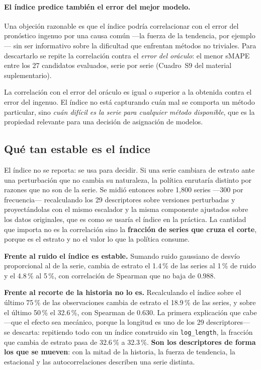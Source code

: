 \paragraph{El índice predice también el error del mejor modelo.} Una objeción
razonable es que el índice podría correlacionar con el error del pronóstico ingenuo
por una causa común ---la fuerza de la tendencia, por ejemplo--- sin ser informativo
sobre la dificultad que enfrentan métodos no triviales. Para descartarlo se repite la
correlación contra el \emph{error del oráculo}: el menor sMAPE entre los 27 candidatos
evaluados, serie por serie (Cuadro~S9 del material suplementario).



La correlación con el error del oráculo es igual o superior a la obtenida contra el
error del ingenuo. El índice no está capturando cuán mal se comporta un método
particular, sino \emph{cuán difícil es la serie para cualquier método disponible},
que es la propiedad relevante para una decisión de asignación de modelos.

\subsection{Qué tan estable es el índice}\label{sec:estabilidad}

El índice no se reporta: se usa para decidir. Si una serie cambiara de estrato ante una
perturbación que no cambia su naturaleza, la política enrutaría distinto por razones que
no son de la serie. Se midió entonces sobre 1{,}800 series ---300 por frecuencia---
recalculando los 29 descriptores sobre versiones perturbadas y proyectándolas con el
mismo escalador y la misma componente ajustados sobre los datos originales, que es como
se usaría el índice en la práctica. La cantidad que importa no es la correlación sino la
\textbf{fracción de series que cruza el corte}, porque es el estrato y no el valor lo que
la política consume.

\textbf{Frente al ruido el índice es estable.} Sumando ruido gaussiano de desvío
proporcional al de la serie, cambia de estrato el 1.4\,\% de las series al 1\,\% de ruido
y el 4.8\,\% al 5\,\%, con correlación de Spearman que no baja de $0.988$.

\textbf{Frente al recorte de la historia no lo es.} Recalculando el índice sobre el
último 75\,\% de las observaciones cambia de estrato el 18.9\,\% de las series, y sobre el
último 50\,\% el 32.6\,\%, con Spearman de $0.630$. La primera explicación que cabe ---que
el efecto sea mecánico, porque la longitud es uno de los 29 descriptores--- se descarta:
repitiendo todo con un índice construido sin \texttt{log\_length}, la fracción que cambia
de estrato pasa de 32.6\,\% a 32.3\,\%. \textbf{Son los descriptores de forma los que se
mueven}: con la mitad de la historia, la fuerza de tendencia, la estacional y las
autocorrelaciones describen una serie distinta.

